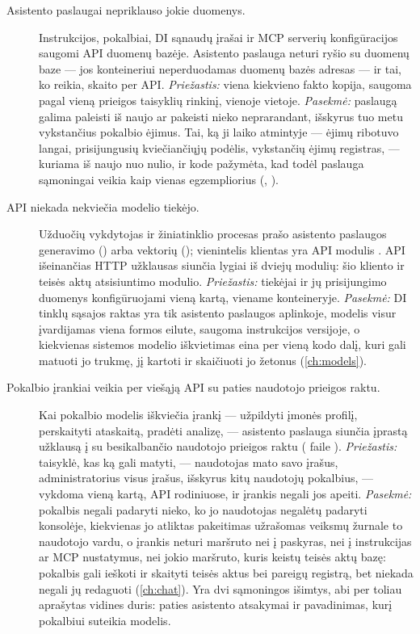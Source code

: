 \begin{description}
  \item[Asistento paslaugai nepriklauso jokie duomenys.]
    Instrukcijos, pokalbiai, DI sąnaudų įrašai ir MCP serverių konfigūracijos saugomi API
    duomenų bazėje. Asistento paslauga neturi ryšio su duomenų baze --- jos konteineriui
    neperduodamas duomenų bazės adresas --- ir tai, ko reikia, skaito per API.
    \emph{Priežastis:} viena kiekvieno fakto kopija, saugoma pagal vieną prieigos taisyklių
    rinkinį, vienoje vietoje. \emph{Pasekmė:} paslaugą
    galima paleisti iš naujo ar pakeisti nieko neprarandant, išskyrus tuo metu vykstančius pokalbio
    ėjimus. Tai, ką ji laiko atmintyje --- ėjimų ribotuvo langai, prisijungusių kviečiančiųjų
    podėlis, vykstančių ėjimų registras, --- kuriama iš naujo nuo nulio, ir kode pažymėta, kad todėl
    paslauga sąmoningai veikia kaip vienas egzempliorius (,
    ).

  \item[API niekada nekviečia modelio tiekėjo.]
    Užduočių vykdytojas ir žiniatinklio procesas prašo asistento paslaugos generavimo
    () arba vektorių
    (); vienintelis klientas yra API modulis
    . API išeinančias HTTP užklausas siunčia lygiai iš dviejų
    modulių: šio kliento ir teisės aktų atsisiuntimo modulio. \emph{Priežastis:} tiekėjai ir
    jų prisijungimo duomenys konfigūruojami vieną kartą, viename konteineryje.
    \emph{Pasekmė:} DI tinklų sąsajos raktas yra tik asistento paslaugos aplinkoje, modelis
    visur įvardijamas viena  formos eilute, saugoma instrukcijos
    versijoje, o kiekvienas sistemos modelio iškvietimas eina per vieną kodo dalį, kuri gali
    matuoti jo trukmę, jį kartoti ir skaičiuoti jo žetonus (\cref{ch:models}).

  \item[Pokalbio įrankiai veikia per viešąją API su paties naudotojo prieigos raktu.]
    Kai pokalbio modelis iškviečia įrankį --- užpildyti įmonės profilį, perskaityti ataskaitą,
    pradėti analizę, --- asistento paslauga siunčia įprastą užklausą į  su
    besikalbančio naudotojo prieigos raktu ( faile
    ). \emph{Priežastis:} taisyklė, kas ką gali matyti, --- naudotojas
    mato savo įrašus, administratorius visus įrašus, išskyrus kitų naudotojų pokalbius, ---
    vykdoma vieną kartą, API rodiniuose, ir įrankis negali jos apeiti. \emph{Pasekmė:}
    pokalbis negali padaryti nieko, ko jo naudotojas negalėtų padaryti konsolėje, kiekvienas
    jo atliktas pakeitimas užrašomas veiksmų žurnale to naudotojo vardu, o įrankis neturi
    maršruto nei į paskyras, nei į instrukcijas ar MCP nustatymus, nei jokio maršruto, kuris
    keistų teisės aktų bazę: pokalbis gali ieškoti ir skaityti teisės aktus bei pareigų
    registrą, bet niekada negali jų redaguoti (\cref{ch:chat}). Yra dvi sąmoningos išimtys, abi
    per toliau aprašytas vidines duris: paties asistento atsakymai ir pavadinimas, kurį
    pokalbiui suteikia modelis.


\end{description}
